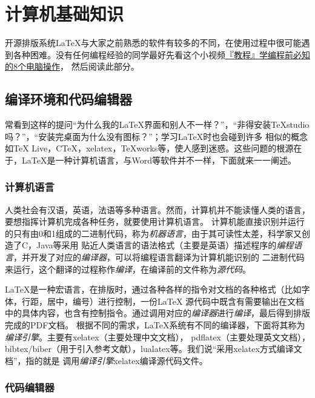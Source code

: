 \section{计算机基础知识}


开源排版系统\LaTeX{}与大家之前熟悉的软件有较多的不同，在使用过程中很可能遇到各种困难。没有任何编程经验的同学最好先看这个小视频\href{https://www.bilibili.com/video/BV1t4411v78E?from=search&seid=5662014810176309518&spm_id_from=333.337.0.0}{『教程』学编程前必知的8个电脑操作}，
然后阅读此部分。


\subsection{编译环境和代码编辑器}
常看到这样的提问“为什么我的\LaTeX{}界面和别人不一样？”，“非得安装TeXstudio吗？”，“安装完桌面为什么没有图标？”；学习LaTeX时也会碰到许多
相似的概念如\TeX{} Live，C\TeX{}，xelatex，TeXworks等，使人感到迷惑。这些问题的根源在于，\LaTeX{}是一种计算机语言，与Word等软件并不一样，下面就来一一阐述。



\subsubsection{计算机语言}

人类社会有汉语，英语，法语等多种语言。然而，计算机并不能读懂人类的语言，要想指挥计算机完成各种任务，就要使用计算机语言。
计算机能直接识别并运行的只有由0和1组成的二进制代码，称为\emph{机器语言}，由于其可读性太差，科学家又创造了C，Java等采用
贴近人类语言的语法格式（主要是英语）描述程序的\emph{编程语言}，并开发了对应的\emph{编译器}，可以将编程语言翻译为计算机能识别的
二进制代码来运行，这个翻译的过程称作\emph{编译}，在编译前的文件称为\emph{源代码}。

\LaTeX{}是一种宏语言，在排版时，通过各种各样的指令对文档的各种格式（比如字体，行距，居中，编号）进行控制，一份\LaTeX{}
源代码中既含有需要输出在文档中的具体内容，也含有控制指令。通过调用对应的\emph{编译器}进行\emph{编译}，最后得到排版完成的PDF文档。
根据不同的需求，\LaTeX{}系统有不同的编译器，下面将其称为\emph{编译引擎}。主要有xelatex（主要处理中文文档），
pdflatex（主要处理英文文档），bibtex/biber（用于引入参考文献），lualatex等。我们说“采用xelatex方式编译文档”，指的就是
调用\emph{编译引擎}xelatex编译源代码文件。




\subsubsection{代码编辑器}


